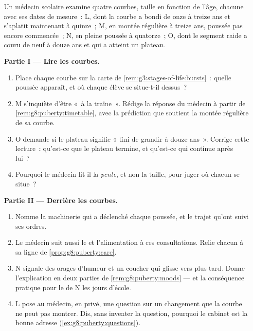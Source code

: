 \begin{problem}\label{pb:g8:puberty:1}
Un médecin scolaire examine quatre courbes, taille en fonction de
l'âge, chacune avec ses dates de mesure~: L, dont la courbe a bondi
de onze à treize ans et s'aplatit maintenant à quinze~; M, en montée
régulière à treize ans, poussée pas encore commencée~; N, en pleine
poussée à quatorze~; O, dont le segment raide a couru de neuf à
douze ans et qui a atteint un plateau.

\medskip\noindent\textbf{Partie I --- Lire les courbes.}
\begin{enumerate}
  \item Place chaque courbe sur la carte de
        \cref{rem:g3:stages-of-life:bursts}~: quelle poussée
        apparaît, et où chaque élève se situe-t-il dessus~?
  \item M s'inquiète d'être «~à la traîne~». Rédige la réponse du
        médecin à partir de
        \cref{rem:g8:puberty:timetable}, avec la prédiction que
        soutient la montée régulière de sa courbe.
  \item O demande si le plateau signifie «~fini de grandir à douze
        ans~». Corrige cette lecture~: qu'est-ce que le plateau
        termine, et qu'est-ce qui continue après lui~?
  \item Pourquoi le médecin lit-il la \emph{pente}, et non la
        taille, pour juger où chacun se situe~?
\end{enumerate}

\medskip\noindent\textbf{Partie II --- Derrière les courbes.}
\begin{enumerate}[resume]
  \item Nomme la machinerie qui a déclenché chaque poussée, et le
        trajet qu'ont suivi ses ordres.
  \item Le médecin suit aussi le  et l'alimentation à ces
        consultations. Relie chacun à sa ligne de
        \cref{prop:g8:puberty:care}.
  \item N signale des orages d'humeur et un coucher qui glisse vers
        plus tard. Donne l'explication en deux parties de
        \cref{rem:g8:puberty:moods} --- et la conséquence pratique
        pour le  de N les jours d'école.
  \item L pose au médecin, en privé, une question sur un changement
        que la courbe ne peut pas montrer. Dis, sans inventer la
        question, pourquoi le cabinet est la bonne adresse
        (\cref{ex:g8:puberty:questions}).
\end{enumerate}


\end{problem}
